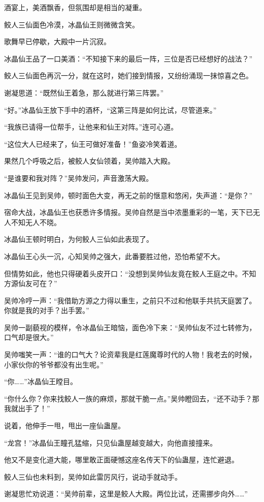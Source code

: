 \begin{this_body}
酒宴上，美酒飘香，但氛围却是相当的凝重。

鲛人三仙面色冷漠，冰晶仙王则微微含笑。

歌舞早已停歇，大殿中一片沉寂。

冰晶仙王品了一口美酒：“不知接下来的最后一阵，三位是否已经想好的战法？”

鲛人三仙面色再沉一分，就在这时，她们接到情报，又纷纷涌现一抹惊喜之色。

谢凝思道：“既然仙王着急，那么就进行第三阵罢。”

“好。”冰晶仙王放下手中的酒杯，“这第三阵是如何比试，尽管道来。”

“我族已请得一位帮手，让他来和仙王对阵。”连可心道。

“这位大人已经来了，仙王可做好准备！”鱼姿冷笑着道。

果然几个呼吸之后，被鲛人女仙领着，吴帅踏入大殿。

“是谁要和我对阵？”吴帅发问，声音激荡大殿。

冰晶仙王见到吴帅，顿时面色大变，再无之前的惬意和悠闲，失声道：“是你？”

宿命大战，冰晶仙王也获悉许多情报。吴帅自然是当中浓墨重彩的一笔，天下已无人不知无人不晓。

冰晶仙王顿时明白，为何鲛人三仙如此表现了。

冰晶仙王心头一沉，心知吴帅之强大，此番要胜过他，恐怕希望不大。

但情势如此，他也只得硬着头皮开口：“没想到吴帅仙友竟在鲛人王庭之中。不知方源仙友可在？”

吴帅冷哼一声：“我借助方源之力得以重生，之前只不过和他联手共抗天庭罢了。你就是我的对手？出手罢。”

吴帅一副藐视的模样，令冰晶仙王暗恼，面色冷下来：“吴帅仙友不过七转修为，口气却是很大。”

吴帅嗤笑一声：“谁的口气大？论资辈我是红莲魔尊时代的人物！我老去的时候，小家伙你的爷爷都没有出生呢。”

“你……”冰晶仙王瞠目。

“你什么你？你来找鲛人一族的麻烦，那就干脆一点。”吴帅瞪回去，“还不动手？那我就出手了！”

说着，他伸手一甩，甩出一座仙蛊屋。

“龙宫！”冰晶仙王瞳孔猛缩，只见仙蛊屋越变越大，向他直接撞来。

他又不是变化道大能，哪里敢正面硬憾这座名传天下的仙蛊屋，连忙避退。

鲛人三仙也未料到，吴帅如此雷厉风行，说动手就动手。

谢凝思忙劝说道：“吴帅前辈，这里是鲛人大殿。两位比试，还需挪步向外……”


\end{this_body}
